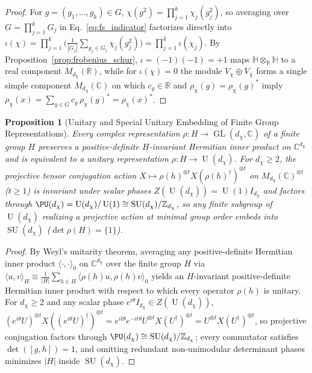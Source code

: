 \documentclass[11pt,a4paper]{article}
\newtheorem{proposition}[theorem]{Proposition}
\theoremstyle{definition}
\theoremstyle{remark}
\newcommand{\R}{\mathbb{R}}
\newcommand{\C}{\mathbb{C}}
\newcommand{\quat}{\mathbb{H}}
\newcommand{\Z}{\mathbb{Z}}
\newcommand{\SU}{\operatorname{SU}}
\newcommand{\U}{\operatorname{U}}
\newcommand{\GL}{\operatorname{GL}}
\begin{document}
\begin{proof}
For $g = (g_1, \dots, g_k) \in G$, $\chi(g^2) = \prod_{j=1}^k \chi_j(g_j^2)$, so averaging over $G = \prod_{j=1}^k G_j$ in Eq.~\eqref{eq:fs_indicator} factorizes directly into $\iota(\chi) = \prod_{j=1}^k \bigl(\frac{1}{|G_j|}\sum_{g_j \in G_j} \chi_j(g_j^2)\bigr) = \prod_{j=1}^k \iota(\chi_j)$. By Proposition~\ref{prop:frobenius_schur}, $\iota = (-1)(-1) = +1$ maps $\quat \otimes_{\R} \quat$ to a real component $M_{d_\chi}(\R)$, while for $\iota(\chi) = 0$ the module $V_\chi \oplus V_{\bar{\chi}}$ forms a single simple component $M_{d_\chi}(\C)$ on which $c_g \in \R$ and $\rho_{\bar{\chi}}(g) = \rho_\chi(g)^*$ imply $\rho_{\bar{\chi}}(x) = \sum_{g \in G} c_g\,\rho_\chi(g)^* = \rho_\chi(x)^*$.
\end{proof}

\begin{proposition}[Unitary and Special Unitary Embedding of Finite Group Representations]
\label{prop:unitary_embedding}
Every complex representation $\rho : H \to \GL(d_\chi, \C)$ of a finite group $H$ preserves a positive-definite $H$-invariant Hermitian inner product on $\C^{d_\chi}$ and is equivalent to a unitary representation $\rho : H \to \U(d_\chi)$. For $d_\chi \ge 2$, the projective tensor conjugation action $X \mapsto \rho(h)^{\otimes t} X (\rho(h)^\dagger)^{\otimes t}$ on $M_{d_\chi}(\C)^{\otimes t}$ ($t \ge 1$) is invariant under scalar phases $Z(\U(d_\chi)) = \U(1)I_{d_\chi}$ and factors through $\PU(d_\chi) = \U(d_\chi)/\U(1) \cong \SU(d_\chi)/\Z_{d_\chi}$, so any finite subgroup of $\U(d_\chi)$ realizing a projective action at minimal group order embeds into $\SU(d_\chi)$ ($\det\rho(H) = \{1\}$).
\end{proposition}

\begin{proof}
By Weyl's unitarity theorem, averaging any positive-definite Hermitian inner product $\langle \cdot, \cdot \rangle_0$ on $\C^{d_\chi}$ over the finite group $H$ via $\langle u, v \rangle_H \equiv \frac{1}{|H|}\sum_{h \in H} \langle \rho(h)u, \rho(h)v \rangle_0$ yields an $H$-invariant positive-definite Hermitian inner product with respect to which every operator $\rho(h)$ is unitary. For $d_\chi \ge 2$ and any scalar phase $e^{i\theta}I_{d_\chi} \in Z(\U(d_\chi))$, $(e^{i\theta}U)^{\otimes t} X ((e^{i\theta}U)^\dagger)^{\otimes t} = e^{it\theta}e^{-it\theta} U^{\otimes t} X (U^\dagger)^{\otimes t} = U^{\otimes t} X (U^\dagger)^{\otimes t}$, so projective conjugation factors through $\PU(d_\chi) \cong \SU(d_\chi)/\Z_{d_\chi}$; every commutator satisfies $\det([g, h]) = 1$, and omitting redundant non-unimodular determinant phases minimizes $|H|$ inside $\SU(d_\chi)$.
\end{proof}
\end{document}
